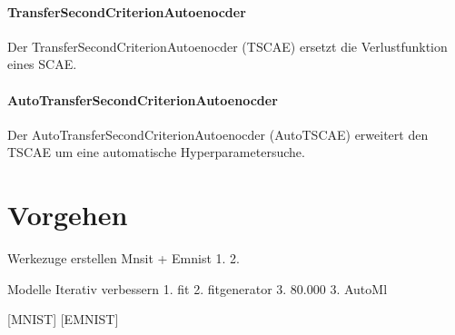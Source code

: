     \paragraph{TransferSecondCriterionAutoenocder} Der TransferSecondCriterionAutoenocder (TSCAE) ersetzt die Verlustfunktion eines SCAE.
 	\paragraph{AutoTransferSecondCriterionAutoenocder} Der AutoTransferSecondCriterionAutoenocder (AutoTSCAE) erweitert den TSCAE um eine automatische Hyperparametersuche. 
  		
	\section{Vorgehen}
	\label{sec:Vorgehen}
	Werkezuge erstellen Mnsit + Emnist
	 1.
	 2.
	 
	Modelle Iterativ verbessern
		1. fit
		2. fitgenerator
		3. 80.000	
	3. AutoMl
		
	
	
	[MNIST] [EMNIST]
	



